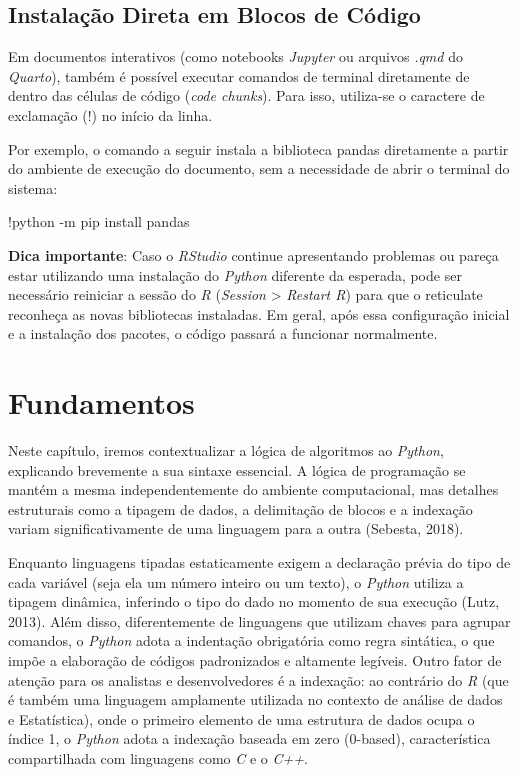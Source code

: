 \documentclass[
  brazilian,
  letterpaper,
  DIV=11,
  numbers=noendperiod]{scrreprt}
\newenvironment{Shaded}{\begin{snugshade}}{\end{snugshade}}
\newcommand{\AttributeTok}[1]{\textcolor[rgb]{0.40,0.45,0.13}{#1}}
\newcommand{\ExtensionTok}[1]{\textcolor[rgb]{0.00,0.23,0.31}{#1}}
\newcommand{\NormalTok}[1]{\textcolor[rgb]{0.00,0.23,0.31}{#1}}
\begin{document}
\section{Instalação Direta em Blocos de
Código}\label{instalauxe7uxe3o-direta-em-blocos-de-cuxf3digo}

Em documentos interativos (como notebooks \emph{Jupyter} ou arquivos
\emph{.qmd} do \emph{Quarto}), também é possível executar comandos de
terminal diretamente de dentro das células de código (\emph{code
chunks}). Para isso, utiliza-se o caractere de exclamação (!) no início
da linha.

Por exemplo, o comando a seguir instala a biblioteca pandas diretamente
a partir do ambiente de execução do documento, sem a necessidade de
abrir o terminal do sistema:

\begin{Shaded}
\begin{Highlighting}[]
\ExtensionTok{!python} \AttributeTok{{-}m}\NormalTok{ pip install pandas}
\end{Highlighting}
\end{Shaded}

\textbf{Dica importante}: Caso o \emph{RStudio} continue apresentando
problemas ou pareça estar utilizando uma instalação do \emph{Python}
diferente da esperada, pode ser necessário reiniciar a sessão do
\emph{R} (\emph{Session} \textgreater{} \emph{Restart R}) para que o
reticulate reconheça as novas bibliotecas instaladas. Em geral, após
essa configuração inicial e a instalação dos pacotes, o código passará a
funcionar normalmente.


\chapter{Fundamentos}\label{fundamentos}

Neste capítulo, iremos contextualizar a lógica de algoritmos ao
\emph{Python}, explicando brevemente a sua sintaxe essencial. A lógica
de programação se mantém a mesma independentemente do ambiente
computacional, mas detalhes estruturais como a tipagem de dados, a
delimitação de blocos e a indexação variam significativamente de uma
linguagem para a outra (Sebesta, 2018).

Enquanto linguagens tipadas estaticamente exigem a declaração prévia do
tipo de cada variável (seja ela um número inteiro ou um texto), o
\emph{Python} utiliza a tipagem dinâmica, inferindo o tipo do dado no
momento de sua execução (Lutz, 2013). Além disso, diferentemente de
linguagens que utilizam chaves para agrupar comandos, o \emph{Python}
adota a indentação obrigatória como regra sintática, o que impõe a
elaboração de códigos padronizados e altamente legíveis. Outro fator de
atenção para os analistas e desenvolvedores é a indexação: ao contrário
do \emph{R} (que é também uma linguagem amplamente utilizada no contexto
de análise de dados e Estatística), onde o primeiro elemento de uma
estrutura de dados ocupa o índice 1, o \emph{Python} adota a indexação
baseada em zero (0-based), característica compartilhada com linguagens
como \emph{C} e o \emph{C++}.
\end{document}
